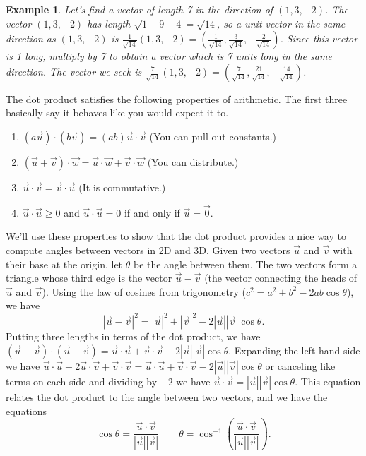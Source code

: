 \documentclass[10pt]{article}
\theoremstyle{plain}
\theoremstyle{box}
\newtheorem{example}{Example}
\newcommand{\ds}{\displaystyle}
\begin{document}
\begin{example}
Let's find a vector of length 7 in the direction of $(1,3,-2)$.  The vector $(1,3,-2)$ has length $\sqrt{1+9+4}=\sqrt{14}$, so a unit vector in the same direction as $(1,3,-2)$ is 
$\ds\frac{1}{\sqrt{14}}(1,3,-2) = \left(\frac{1}{\sqrt{14}},\frac{3}{\sqrt{14}},-\frac{2}{\sqrt{14}}\right)$.  
Since this vector is 1 long, multiply by 7 to obtain a vector which is 7 units long in the same direction.  The vector we seek is  
$\ds\frac{7}{\sqrt{14}}(1,3,-2) = \left(\frac{7}{\sqrt{14}},\frac{21}{\sqrt{14}},-\frac{14}{\sqrt{14}}\right)$.  
\end{example}



The dot product satisfies the following properties of arithmetic. The first three basically say it behaves like you would expect it to.
\begin{enumerate}
\item $(a\vec u)\cdot (b\vec v) = (ab)\vec u\cdot \vec v$ (You can pull out constants.)
\item $(\vec u +\vec v)\cdot \vec w = \vec u\cdot \vec w + \vec v\cdot \vec w$ (You can distribute.)
\item $\vec u\cdot \vec v = \vec v\cdot \vec u$ (It is commutative.) 
\item $\vec u\cdot \vec u \geq 0$ and $\vec u\cdot\vec u=0$ if and only if $\vec u =\vec 0$.
\end{enumerate}
We'll use these properties to show that the dot product provides a nice way to compute angles between vectors in 2D and 3D.  Given two vectors $\vec u$ and $\vec v$ with their base at the origin, let $\theta$ be the angle between them. The two vectors form a triangle whose third edge is the vector $\vec u-\vec v$ (the vector connecting the heads of $\vec u$ and $\vec v$).  Using the law of cosines from trigonometry ($c^2=a^2+b^2-2ab\cos \theta$), we have $$|\vec u-\vec v|^2 = |\vec u|^2+|\vec v|^2 -2|\vec u||\vec v|\cos\theta.$$  Putting three lengths in terms of the dot product, we have $(\vec u-\vec v)\cdot(\vec u-\vec v) = \vec u\cdot \vec u+\vec v\cdot\vec v -2 |\vec u||\vec v|\cos\theta$.  Expanding the left hand side we have 
$\vec u\cdot\vec u-2\vec u \cdot \vec v+\vec v\cdot \vec v = \vec u\cdot \vec u+\vec v\cdot\vec v -2 |\vec u||\vec v|\cos\theta$ or canceling like terms on each side and dividing by $-2$ we have $\vec u \cdot \vec v = |\vec u||\vec v|\cos\theta$. This equation relates the dot product to the angle between two vectors, and we have the equations
$$\cos \theta = \frac{\vec u\cdot\vec v}{|\vec u||\vec v|}\quad\quad \theta = \cos^{-1}\left(\frac{\vec u\cdot\vec v}{|\vec u||\vec v|}\right).$$
\end{document}
